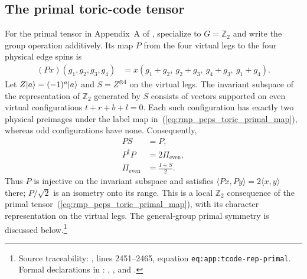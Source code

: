 \documentclass{article}
\begin{document}
\subsection{The primal toric-code tensor}
For the primal tensor in Appendix~A of \cite{Cirac2021Matrix}, specialize to
$G=\mathbb Z_2$ and write the group operation additively. Its map $P$ from
the four virtual legs to the four physical edge spins is
\begin{align}
    (Px)(g_1,g_2,g_3,g_4)
    &=x(g_1+g_2,\ g_2+g_3,\ g_4+g_3,\ g_1+g_4).
    \label{eq:rmp_peps_toric_primal_map}
\end{align}
Let $Z|a\rangle=(-1)^a|a\rangle$ and $S=Z^{\otimes4}$ on the virtual legs.
The invariant subspace of the representation of $\mathbb Z_2$ generated
by $S$ consists of vectors supported on even virtual configurations
$t+r+b+l=0$. Each such configuration has exactly two physical preimages
under the label map in~(\ref{eq:rmp_peps_toric_primal_map}), whereas odd
configurations have none.
Consequently,
\begin{align}
    PS&=P,
    \label{eq:rmp_peps_toric_primal_invariance}\\
    P^\dagger P&=2\Pi_{\mathrm{even}},
    \label{eq:rmp_peps_toric_primal_gram}\\
    \Pi_{\mathrm{even}}&=\frac{I+S}{2}.
    \label{eq:rmp_peps_toric_primal_projection}
\end{align}
Thus $P$ is injective on the invariant subspace and satisfies
$\langle Px,Py\rangle=2\langle x,y\rangle$ there; $P/\sqrt2$ is
an isometry onto its range. This is a local $\mathbb Z_2$ consequence
of the primal tensor~(\ref{eq:rmp_peps_toric_primal_map}), with its character
representation on the virtual legs. The general-group primal symmetry is discussed
below.\footnote{Source traceability:
    , lines 2451--2465,
    equation \texttt{eq:app:tcode-rep-primal}. Formal declarations in
    :
    ,
    ,
    and .}
\end{document}
